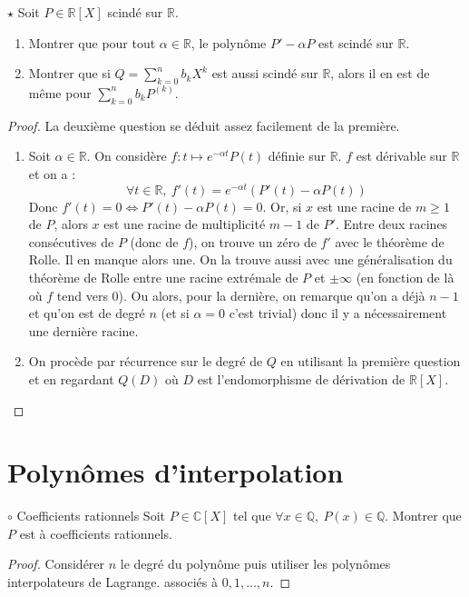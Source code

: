 \documentclass[french,a4paper]{article}
\newcommand{\Q}{\mathbb{Q}}
\newcommand{\R}{\mathbb{R}}
\newcommand{\C}{\mathbb{C}}
\theoremstyle{plain}
\theoremstyle{definition}
\theoremstyle{remark}
\begin{document}
\begin{ex}{$\star$}
	Soit $P\in\R[X]$ scindé sur $\R$.
	\begin{enumerate}
		\item Montrer que pour tout $\alpha\in\R$, le polynôme $P'-\alpha P$ est scindé sur $\R$.
		\item Montrer que si $Q=\displaystyle\sum_{k=0}^{n}b_kX^k$ est aussi scindé sur $\R$, alors il en est de même pour $\displaystyle\sum_{k=0}^{n}b_kP^{(k)}$.
	\end{enumerate}
\end{ex}
\begin{proof}
	La deuxième question se déduit assez facilement de la première.
	\begin{enumerate}
		\item Soit $\alpha\in\R$. On considère $f:t\mapsto e^{-\alpha t}P(t)$ définie sur $\R$. $f$ est dérivable sur $\R$ et on a : $$\forall t\in\R,\ f'(t)=e^{-\alpha t}(P'(t)-\alpha P(t))$$ Donc $f'(t)=0\iff P'(t)-\alpha P(t)=0$. Or, si $x$ est une racine de $m\geqslant 1$ de $P$, alors $x$ est une racine de multiplicité $m-1$ de $P'$. Entre deux racines consécutives de $P$ (donc de $f$), on trouve un zéro de $f'$ avec le théorème de Rolle. Il en manque alors une. On la trouve aussi avec une généralisation du théorème de Rolle entre une racine extrémale de $P$ et $\pm\infty$ (en fonction de là où $f$ tend vers $0$). Ou alors, pour la dernière, on remarque qu'on a déjà $n-1$ et qu'on est de degré $n$ (et si $\alpha=0$ c'est trivial) donc il y a nécessairement une dernière racine.
		\item On procède par récurrence sur le degré de $Q$ en utilisant la première question et en regardant $Q(D)$ où $D$ est l'endomorphisme de dérivation de $\R[X]$.
	\end{enumerate}
\end{proof}

\section{Polynômes d'interpolation}

\begin{ex}[Morlot]{$\circ$ Coefficients rationnels}
	Soit $P \in \C[X]$ tel que $\forall x \in \Q, \ P(x)\in\Q$. Montrer que $P$ est à coefficients rationnels.
\end{ex}
\begin{proof}
	Considérer $n$ le degré du polynôme puis utiliser les polynômes interpolateurs de Lagrange. associés à $0,1,\ldots,n$.	
\end{proof}
\end{document}
